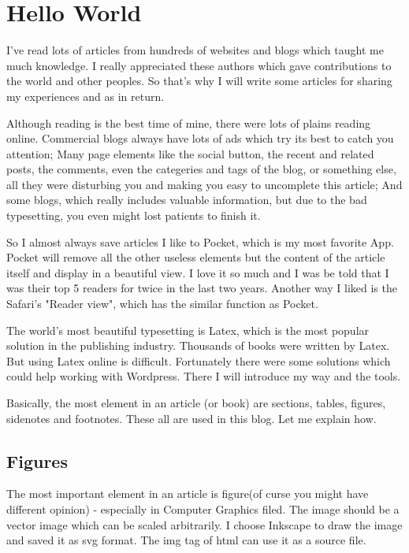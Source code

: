 \chapter{Hello World} 
I've read lots of articles from hundreds of websites and blogs which taught me much knowledge. I really appreciated these authors which gave contributions to the world and other peoples. So that's why I will write some articles for sharing my experiences and as in return.

Although reading is the best time of mine, there were lots of plains reading online. Commercial blogs always have lots of ads which try its best to catch you attention; Many page elements like the social button, the recent and related posts, the comments, even the categeries and tags of the blog, or something else, all they were disturbing you and making you easy to uncomplete this article; And some blogs, which really includes valuable information, but due to the bad typesetting, you even might lost patients to finish it.  

So I almost always save articles I like to Pocket, which is my most favorite App. Pocket will remove all the other useless elements but the content of the article itself and display in a beautiful view. I love it so much and I was be told that I was their top 5 readers for twice in the last two years. Another way I liked is the Safari's "Reader view", which has the similar function as Pocket.

The world's most beautiful typesetting is Latex, which is the most popular solution in the publishing industry. Thousands of books were written by Latex. But using Latex online is difficult. Fortunately there were some solutions which could help working with Wordpress. There I will introduce my way and the tools.
    
Basically, the most element in an article (or book) are sections, tables, figures, sidenotes and footnotes. These all are used in this blog. Let me explain how.


\section{Figures}
The most important element in an article is figure(of curse you might have different opinion) - especially in Computer Graphics filed. The image should be a vector image which can be scaled arbitrarily. I choose Inkscape to draw the image and saved it as svg format. The img tag of html can use it as a source file. 

